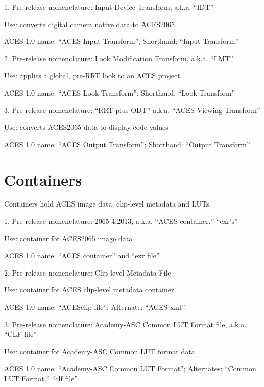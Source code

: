 1. Pre-release nomenclature: Input Device Transform, a.k.a. ``IDT''

Use: converts digital camera native data to ACES2065

ACES 1.0 name: ``ACES Input Transform''; Shorthand: ``Input Transform''

\vspace{10pt}
2. Pre-release nomenclature: Look Modification Transform, a.k.a. ``LMT''

Use: applies a global, pre-RRT look to an ACES project

ACES 1.0 name: ``ACES Look Transform''; Shorthand: ``Look Transform''

\vspace{10pt}
3. Pre-release nomenclature: ``RRT plus ODT'' a.k.a. ``ACES Viewing Transform''

Use: converts ACES2065 data to display code values

ACES 1.0 name: ``ACES Output Transform''; Shorthand: ``Output Transform''

\section{Containers}
Containers hold ACES image data, clip-level metadata and LUTs.

1. Pre-release nomenclature: 2065-4:2013, a.k.a. ``ACES container,'' ``exr’s''

Use: container for ACES2065 image data

ACES 1.0 name: ``ACES container'' and ``exr file'' 

\vspace{10pt}
2. Pre-release nomenclature: Clip-level Metadata File

Use: container for ACES clip-level metadata container

ACES 1.0 name: ``ACESclip file''; Alternate: ``ACES xml''

\vspace{10pt}
3. Pre-release nomenclature: Academy-ASC Common LUT Format file, a.k.a. ``CLF file''

Use: container for Academy-ASC Common LUT format data

ACES 1.0 name: ``Academy-ASC Common LUT Format''; Alternates: ``Common LUT Format,''  ``clf file''